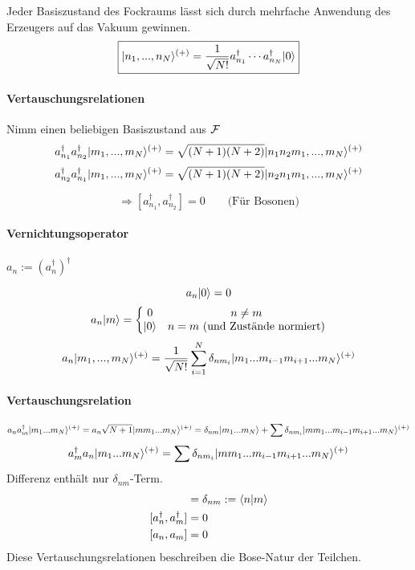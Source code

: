 \documentclass[11pt,a4paper]{report}
\begin{document}
Jeder Basiszustand des Fockraums lässt sich durch mehrfache Anwendung des Erzeugers auf das Vakuum gewinnen.
$$\boxed{|n_1,...,n_N\rangle^{(+)} = \frac{1}{\sqrt{N!}}a_{n_1}^\dagger\cdots a_{n_N}^\dagger |0\rangle}$$

\paragraph{Vertauschungsrelationen} Nimm einen beliebigen Basiszustand aus $\mathcal{F}$
$$a_{n_1}^\dagger a_{n_2}^\dagger |m_1,...,m_N\rangle^{(+)} = \sqrt{(N+1)(N+2)}|n_1n_2m_1,...,m_N\rangle^{(+)}$$
$$a_{n_2}^\dagger a_{n_1}^\dagger |m_1,...,m_N\rangle^{(+)} = \sqrt{(N+1)(N+2)}|n_2n_1m_1,...,m_N\rangle^{(+)}$$

\newcommand{\create}[1]{a_{#1}^\dagger}
\newcommand{\destroy}[1]{a_{#1}}

$$\Rightarrow [\create{n_1},\create{n_2}] = 0\qquad \text{(Für Bosonen)}$$

\paragraph{Vernichtungsoperator} $a_n := (\create{n})^\dagger$

$$\destroy{n}\ket{0} = 0$$
$$\destroy{n}\ket{m} = \left\{\begin{matrix}
0 & n\neq m \\
\ket{0} &n=m \text{ (und Zustände normiert)}
\end{matrix}\right.$$
$$\destroy{n}\ket{m_1,...,m_N}^{(+)} = \frac{1}{\sqrt{N!}}\sum_{i=1}^N \delta_{nm_i}\ket{m_1...m_{i-1}m_{i+1}...m_N}^{(+)}$$

\paragraph{Vertauschungsrelation}
$$\destroy{n}\create{m}\ket{m_1...m_N}^{(+)} = \destroy{n}\sqrt{N+1}\ket{mm_1...m_N}^{(+)} =  \delta_{nm}\ket{m_1...m_N} + \sum \delta_{nm_i}\ket{mm_1...m_{i-1}m_{i+1}...m_N}^{(+)}$$
$$\create{m}\destroy{n}\ket{m_1...m_N}^{(+)}= \sum \delta_{nm_i}\ket{mm_1...m_{i-1}m_{i+1}...m_N}^{(+)}$$
Differenz enthält nur $\delta_{nm}$-Term.
\begin{align*}
[\destroy{n},\create{m}]&=\delta_{nm} :=\sprod{n}{m} \\
[\create{n},\create{m}] &= 0 \\
[\destroy{n},\destroy{m}] &= 0
\end{align*}
Diese Vertauschungsrelationen beschreiben die Bose-Natur der Teilchen. 
\end{document}
